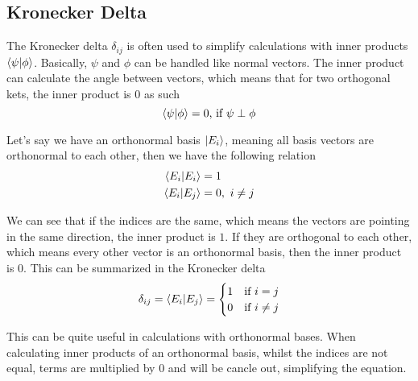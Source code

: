 \subsection{Kronecker Delta}
The Kronecker delta $\delta_{ij}$ is often used to simplify calculations with inner products $\braket{\psi | \phi}$.
Basically, $\psi$ and $\phi$ can be handled like normal vectors. 
The inner product can calculate the angle between vectors, which means that for two orthogonal kets, the inner product is $0$ as such
\begin{equation}
\braket{\psi|\phi} = 0 \text{, if } \psi \perp \phi\\
\end{equation}

Let's say we have an orthonormal basis $\ket{E_i}$, meaning all basis vectors are orthonormal to each other, then we have the following relation
\begin{equation}
\begin{split}
\braket{E_i|E_i} &= 1\\
\braket{E_i|E_j} &= 0, \ i\neq j
\end{split}
\end{equation}

We can see that if the indices are the same, which means the vectors are pointing in the same direction, the inner product is $1$.
If they are orthogonal to each other, which means every other vector is an orthonormal basis, then the inner product is $0$.
This can be summarized in the Kronecker delta
\begin{equation}
    \delta_{ij} = \braket{E_i|E_j} = \begin{cases} 1 & \text{if } i=j\\ 0 & \text{if } i \neq j
\end{cases}
\end{equation}

This can be quite useful in calculations with orthonormal bases.
When calculating inner products of an orthonormal basis, whilst the indices are not equal, terms are multiplied by $0$ and will be cancle out, simplifying the equation.

